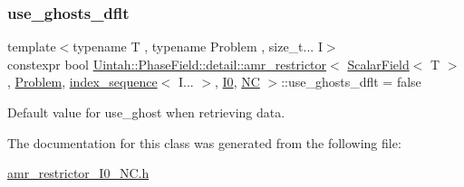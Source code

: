 \subsubsection{\texorpdfstring{use\+\_\+ghosts\+\_\+dflt}{use\_ghosts\_dflt}}
{\footnotesize\ttfamily template$<$typename T , typename Problem , size\+\_\+t... I$>$ \\
constexpr bool \hyperlink{classUintah_1_1PhaseField_1_1detail_1_1amr__restrictor}{Uintah\+::\+Phase\+Field\+::detail\+::amr\+\_\+restrictor}$<$ \hyperlink{structUintah_1_1PhaseField_1_1ScalarField}{Scalar\+Field}$<$ T $>$, \hyperlink{classUintah_1_1PhaseField_1_1Problem}{Problem}, \hyperlink{namespaceUintah_1_1PhaseField_a237de804d99512e50613aff7c94a9461}{index\+\_\+sequence}$<$ I... $>$, \hyperlink{namespaceUintah_1_1PhaseField_a547ce3002aa97fbd3ef3192a6eec8406abdd8ebcbdfd71d1125937e3012dc45fb}{I0}, \hyperlink{namespaceUintah_1_1PhaseField_a33d355affda78a83f45755ba8388cedda77924170fe82bfd58b74ca3e44139718}{NC} $>$\+::use\+\_\+ghosts\+\_\+dflt = false\hspace{0.3cm}{\ttfamily [static]}}



Default value for use\+\_\+ghost when retrieving data. 



The documentation for this class was generated from the following file\+:\begin{DoxyCompactItemize}
\item 
\hyperlink{amr__restrictor__I0__NC_8h}{amr\+\_\+restrictor\+\_\+\+I0\+\_\+\+N\+C.\+h}\end{DoxyCompactItemize}

